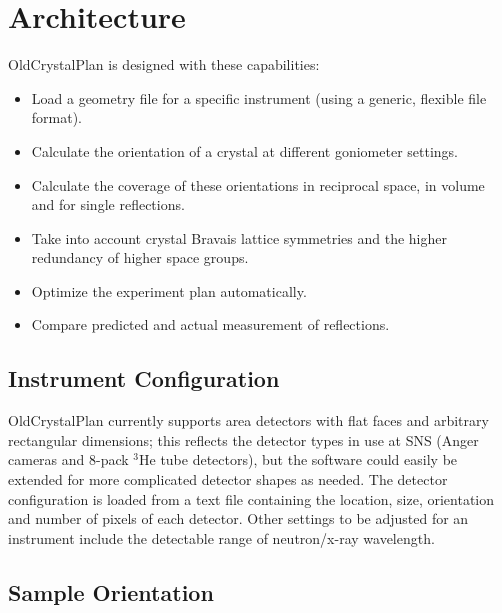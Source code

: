 \documentclass[final]{iucr}              %
\begin{document}
\section{Architecture}

OldCrystalPlan is designed with these capabilities:

\begin{itemize}
  \item Load a geometry file for a specific instrument (using a generic,
  flexible file format).
  \item Calculate the orientation of a crystal at different goniometer settings.
  \item Calculate the coverage of these orientations in reciprocal space,
  in volume and for single reflections.
  \item Take into account crystal Bravais lattice symmetries and the higher
  redundancy of higher space groups.
  \item Optimize the experiment plan automatically.
  \item Compare predicted and actual measurement of reflections.
\end{itemize}

\subsection{Instrument Configuration}

OldCrystalPlan currently supports area detectors with flat faces and arbitrary
rectangular dimensions; this reflects the detector types in use at SNS (Anger
cameras and 8-pack $^3$He tube detectors), but the software could easily be
extended for more complicated detector shapes as needed. The detector configuration is loaded from
a text file containing the location, size, orientation and number of pixels of
each detector. Other settings to be adjusted for an instrument include the
detectable range of neutron/x-ray wavelength.


\subsection{Sample Orientation}
\end{document}
